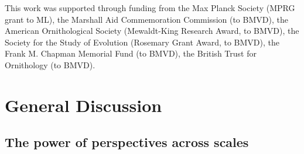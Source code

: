\documentclass[a4paper, nobind]{templates/ociamthesis}
\begin{document}
This work was supported through funding from the Max Planck Society (MPRG grant to ML), the Marshall Aid Commemoration Commission (to BMVD), the American Ornithological Society (Mewaldt-King Research Award, to BMVD), the Society for the Study of Evolution (Rosemary Grant Award, to BMVD), the Frank M. Chapman Memorial Fund (to BMVD), the British Trust for Ornithology (to BMVD).

\printbibliography[segment= herefsection,heading=subbibliography]

\hypertarget{general-discussion}{%
\chapter*{General Discussion}\label{general-discussion}}


\hypertarget{the-power-of-perspectives-across-scales}{%
\section*{The power of perspectives across scales}\label{the-power-of-perspectives-across-scales}}
\end{document}
